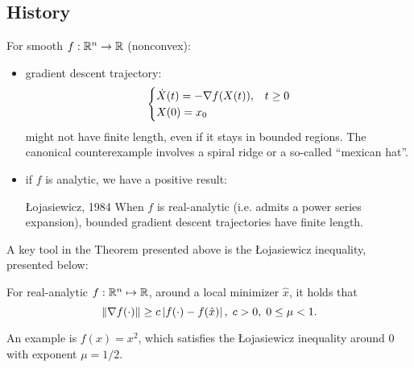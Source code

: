 \subsection{History}
For smooth $f: \mathbb{R}^n \to \mathbb{R}$ (nonconvex):
\begin{itemize}
	\item gradient descent trajectory:
		\[
			\begin{cases}
				\dot{X}(t) = -\nabla f(X(t)), & t \geq 0 \\
				X(0) = x_0 \\
			\end{cases}
		\]
		might not have finite length, even if it stays in bounded regions. The
		canonical counterexample involves a spiral ridge or a so-called
		``mexican hat''.
	\item if $f$ is analytic, we have a positive result:
		\begin{ctheorem}{{\L}ojasiewicz, 1984}
			When $f$ is real-analytic (i.e. admits a power series expansion),
			bounded gradient descent trajectories have finite length.
		\end{ctheorem}
\end{itemize}
A key tool in the Theorem presented above is the {\L}ojasiewicz inequality,
presented below:
\begin{ctheorem}{\cite{Loja59}}
	For real-analytic $f: \mathbb{R}^n \mapsto \mathbb{R}$, around a local minimizer
	$\hat{x}$, it holds that
	\[
		\left \| \nabla f(\cdot) \right \| \geq c \left| f(\cdot) - f(\hat{x}) \right|, \;
		c > 0, \; 0 \leq \mu < 1.
	\]
\end{ctheorem}
An example is $f(x) = x^2$, which satisfies the {\L}ojasiewicz inequality
around $0$ with exponent $\mu = 1/2$.
